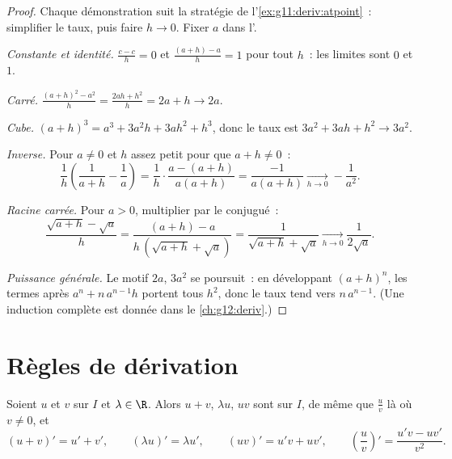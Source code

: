 \begin{proof}
Chaque démonstration suit la stratégie de
l'\cref{ex:g11:deriv:atpoint}~: simplifier le taux, puis faire
$h \to 0$. Fixer $a$ dans l'.

\emph{Constante et identité.} $\frac{c - c}{h} = 0$ et
$\frac{(a+h) - a}{h} = 1$ pour tout $h$~: les limites sont $0$ et $1$.

\emph{Carré.} $\frac{(a+h)^2 - a^2}{h} = \frac{2ah + h^2}{h} = 2a + h
\to 2a$.

\emph{Cube.} $(a+h)^3 = a^3 + 3a^2h + 3ah^2 + h^3$, donc le taux est
$3a^2 + 3ah + h^2 \to 3a^2$.

\emph{Inverse.} Pour $a \neq 0$ et $h$ assez petit pour que
$a + h \neq 0$~:
\[
\frac{1}{h}\left(\frac{1}{a+h} - \frac{1}{a}\right)
= \frac{1}{h} \cdot \frac{a - (a+h)}{a(a+h)}
= \frac{-1}{a(a+h)}
\xrightarrow[h \to 0]{} -\frac{1}{a^2}.
\]

\emph{Racine carrée.} Pour $a > 0$, multiplier par le conjugué~:
\[
\frac{\sqrt{a+h} - \sqrt a}{h}
= \frac{(a + h) - a}{h\,(\sqrt{a+h} + \sqrt a)}
= \frac{1}{\sqrt{a+h} + \sqrt a}
\xrightarrow[h \to 0]{} \frac{1}{2\sqrt a}.
\]

\emph{Puissance générale.} Le motif $2a$, $3a^2$ se poursuit~: en
développant $(a+h)^n$, les termes après $a^n + n\,a^{n-1}h$ portent tous
$h^2$, donc le taux tend vers $n\,a^{n-1}$. (Une induction complète est
donnée dans le \cref{ch:g12:deriv}.)
\end{proof}

\section{Règles de dérivation}

\begin{theorem}[Opérations]\label{thm:g11:deriv:rules}
Soient $u$ et $v$  sur $I$ et $\lambda \in \R$. Alors
$u + v$, $\lambda u$, $uv$ sont  sur $I$, de même que
$\frac{u}{v}$ là où $v \neq 0$, et
\[
(u+v)' = u' + v', \qquad
(\lambda u)' = \lambda u', \qquad
(uv)' = u'v + uv', \qquad
\left(\frac{u}{v}\right)' = \frac{u'v - uv'}{v^2}.
\]
\end{theorem}

